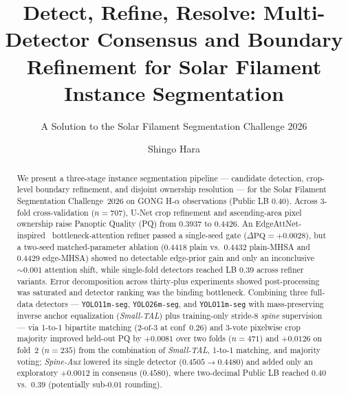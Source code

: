 \documentclass[sigconf]{acmart}
\begin{document}
\title[Detect, Refine, Resolve]{Detect, Refine, Resolve: Multi-Detector Consensus and Boundary Refinement for Solar Filament Instance Segmentation}
\subtitle{A Solution to the Solar Filament Segmentation Challenge 2026} %

\author{Shingo Hara}
\renewcommand{\shortauthors}{Hara}

\begin{abstract}
    We present a three-stage instance segmentation pipeline --- candidate detection, crop-level boundary refinement, and disjoint ownership resolution --- for the Solar Filament Segmentation Challenge~2026 on GONG H-$\alpha$ observations (Public LB $\mathbf{0.40}$). Across 3-fold cross-validation ($n{=}707$), U-Net crop refinement and ascending-area pixel ownership raise Panoptic Quality (PQ) from $0.3937$ to $0.4426$. An EdgeAttNet-inspired~\cite{edgeattnet2025} bottleneck-attention refiner passed a single-seed gate ($\Delta\mathrm{PQ}{=}{+}0.0028$), but a two-seed matched-parameter ablation ($0.4418$ plain vs.\ $0.4432$ plain-MHSA and $0.4429$ edge-MHSA) showed no detectable edge-prior gain and only an inconclusive ${\sim}0.001$ attention shift, while single-fold detectors reached LB $0.39$ across refiner variants. Error decomposition across thirty-plus experiments showed post-processing was saturated and detector ranking was the binding bottleneck. Combining three full-data detectors --- \texttt{YOLO11m-seg}, \texttt{YOLO26m-seg}, and \texttt{YOLO11m-seg} with mass-preserving inverse anchor equalization (\emph{Small-TAL}) plus training-only stride-8 \emph{spine} supervision --- via 1-to-1 bipartite matching ($2\text{-of-}3$ at conf~$0.26$) and 3-vote pixelwise crop majority improved held-out PQ by $+0.0081$ over two folds ($n{=}471$) and $+0.0126$ on fold~2 ($n{=}235$) from the combination of \emph{Small-TAL}, 1-to-1 matching, and majority voting; \emph{Spine-Aux} lowered its single detector ($0.4505{\rightarrow}0.4480$) and added only an exploratory $+0.0012$ in consensus ($0.4580$), where two-decimal Public LB reached $\mathbf{0.40}$ vs.\ $0.39$ (potentially sub-$0.01$ rounding).
\end{abstract}

\maketitle

\end{document}

